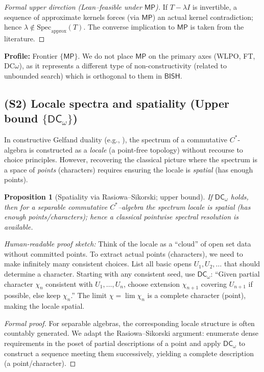 \documentclass[11pt]{article}
\newcommand{\DCw}{\mathsf{DC}_{\omega}}
\newcommand{\MP}{\mathsf{MP}}
\theoremstyle{plain}
\newtheorem{proposition}[theorem]{Proposition}
\theoremstyle{definition}
\theoremstyle{remark}
\newenvironment{hrproof}{\noindent\textit{Human-readable proof sketch:} }{}
\newcommand{\BISH}{\mathsf{BISH}}
\begin{document}
\begin{proof}[Formal upper direction (Lean--feasible under $\MP$)]
If $T-\lambda I$ is invertible, a sequence of approximate kernels forces (via $\MP$) an actual kernel contradiction; hence $\lambda\notin \mathrm{Spec}_{\mathrm{approx}}(T)$.
The converse implication to $\MP$ is taken from the literature.
\end{proof}

\noindent\textbf{Profile:} Frontier $\{\MP\}$. We do not place $\MP$ on the primary axes (WLPO, FT, DC$\omega$), as it represents a different type of non-constructivity (related to unbounded search) which is orthogonal to them in $\BISH$.

\subsection{(S2) Locale spectra and spatiality (Upper bound $\{\DCw\}$)}
In constructive Gelfand duality (e.g., \cite{CoquandSpitters}), the spectrum of a commutative $C^*$-algebra is constructed as a \emph{locale} (a point-free topology) without recourse to choice principles. However, recovering the classical picture where the spectrum is a space of \emph{points} (characters) requires ensuring the locale is \emph{spatial} (has enough points).

\begin{proposition}[Spatiality via Rasiowa--Sikorski; upper bound]
If $\DCw$ holds, then for a \emph{separable} commutative $C^*$--algebra the spectrum locale is spatial (has enough points/characters); hence a classical pointwise spectral resolution is available.
\end{proposition}

\begin{hrproof}
Think of the locale as a ``cloud'' of open set data without committed points. To extract actual points (characters), we need to make infinitely many consistent choices. List all basic opens $U_1, U_2,\ldots$ that should determine a character. Starting with any consistent seed, use $\DCw$: ``Given partial character $\chi_n$ consistent with $U_1,\ldots,U_n$, choose extension $\chi_{n+1}$ covering $U_{n+1}$ if possible, else keep $\chi_n$.'' The limit $\chi = \lim \chi_n$ is a complete character (point), making the locale spatial.
\end{hrproof}

\begin{proof}[Formal proof]
For separable algebras, the corresponding locale structure is often countably generated. We adapt the Rasiowa--Sikorski argument: enumerate dense requirements in the poset of partial descriptions of a point and apply $\DCw$ to construct a sequence meeting them successively, yielding a complete description (a point/character).
\end{proof}
\end{document}
